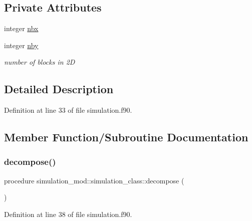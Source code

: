 \subsection*{Private Attributes}
\begin{DoxyCompactItemize}
\item 
integer \mbox{\hyperlink{structsimulation__mod_1_1simulation__class_a772b57a0802913e1a715bbe46dc67112}{nbx}}
\item 
integer \mbox{\hyperlink{structsimulation__mod_1_1simulation__class_aaa602a0922f7c95060226627eaf5104e}{nby}}
\begin{DoxyCompactList}\small\item\em number of blocks in 2D \end{DoxyCompactList}\end{DoxyCompactItemize}


\subsection{Detailed Description}


Definition at line 33 of file simulation.\+f90.



\subsection{Member Function/\+Subroutine Documentation}
\mbox{\label{structsimulation__mod_1_1simulation__class_a5c614118dc1ffc74245ef0c5b2cc3a1d}} 
\subsubsection{\texorpdfstring{decompose()}{decompose()}}
{\footnotesize\ttfamily procedure simulation\+\_\+mod\+::simulation\+\_\+class\+::decompose (\begin{DoxyParamCaption}{ }\end{DoxyParamCaption})\hspace{0.3cm}{\ttfamily [private]}}



Definition at line 38 of file simulation.\+f90.

\mbox{\label{structsimulation__mod_1_1simulation__class_afcc0d63c0a27727f834304b6a7827f3c}} 
